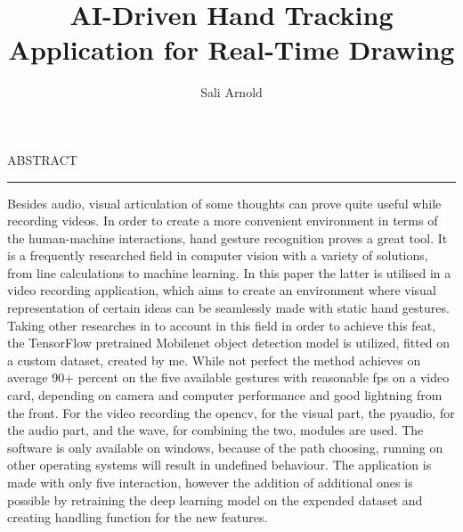 \documentclass[12pt]{report}
\begin{document}
\title{AI-Driven Hand Tracking Application for Real-Time Drawing}					   
\author{Sali Arnold}											
				
\maketitle


\newpage
\thispagestyle{empty}
\mbox{}
\newpage
{} 

\cleardoublepage
ABSTRACT
\vspace{0.5cm}	
\hrule
\vspace{0.5cm}	

\par Besides audio, visual articulation of some thoughts can prove quite useful while recording videos. In order to create a more convenient environment in terms of the human-machine interactions, hand gesture recognition proves a great tool. It is a frequently researched field in computer vision with a variety of solutions, from line calculations to machine learning. In this paper the latter is utilised in a video recording application, which aims to create an environment where visual representation of certain ideas can be seamlessly made with static hand gestures. Taking other researches in to account in this field in order to achieve this feat, the TensorFlow pretrained Mobilenet object detection model is utilized, fitted on a custom dataset, created by me. While not perfect the method achieves on average 90+ percent on the five available gestures with reasonable fps on a video card, depending on camera and computer performance and good lightning from the front. For the video recording the opencv, for the visual part, the pyaudio, for the audio part, and the wave, for combining the two, modules are used. The software is only available on windows, because of the path choosing, running on other operating systems will result in undefined behaviour. The application is made with only five interaction, however the addition of additional ones is possible by retraining the deep learning model on the expended dataset and creating handling function for the new features.

\tableofcontents

\newpage
{}














\end{document}
